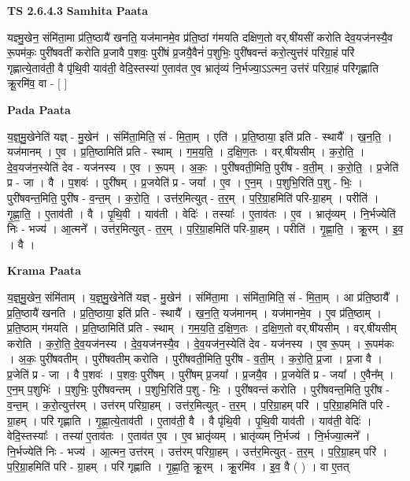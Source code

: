\documentclass[17pt]{extarticle}
\begin{document}
\textbf{TS 2.6.4.3 } \newline
\textbf{Samhita Paata} \newline

यज्ञ्मु॒खेन॒ संमि॑ता॒मा प्र॑ति॒ष्ठायै॑ खनति॒ यज॑मानमे॒व प्र॑ति॒ष्ठां ग॑मयति दक्षिण॒तो वर्.षी॑यसीं करोति देव॒यज॑नस्यै॒व रू॒पम॑कः॒ पुरी॑षवतीं करोति प्र॒जावै प॒शवः॒ पुरी॑षं प्र॒जयै॒वैनं॑ प॒शुभिः॒ पुरी॑षवन्तं करो॒त्युत्त॑रं परिग्रा॒हं परि॑ गृह्णात्ये॒ताव॑ती॒ वै पृ॑थि॒वी याव॑ती॒ वेदि॒स्तस्या॑ ए॒ताव॑त ए॒व भ्रातृ॑व्यं नि॒र्भज्या॒ऽऽत्मन॒ उत्त॑रं परिग्रा॒हं परि॑गृह्णाति क्रू॒रमि॑व॒ वा - [  ] \newline

\textbf{Pada Paata} \newline

य॒ज्ञ्॒मु॒खेनेति॑ यज्ञ् - मु॒खेन॑ । संमि॑ता॒मिति॒ सं - मि॒ता॒म् । एति॑ । प्र॒ति॒ष्ठाया॒ इति॑ प्रति - स्थायै᳚ । ख॒न॒ति॒ । यज॑मानम् । ए॒व । प्र॒ति॒ष्ठामिति॑ प्रति - स्थाम् । ग॒म॒य॒ति॒ । द॒क्षि॒ण॒तः । वर्.षी॑यसीम् । क॒रो॒ति॒ । दे॒व॒यज॑न॒स्येति॑ देव - यज॑नस्य । ए॒व । रू॒पम् । अ॒कः॒ । पुरी॑षवती॒मिति॒ पुरी॑ष - व॒ती॒म् । क॒रो॒ति॒ । प्र॒जेति॑ प्र - जा । वै । प॒शवः॑ । पुरी॑षम् । प्र॒जयेति॑ प्र - जया᳚ । ए॒व । ए॒न॒म् । प॒शुभि॒रिति॑ प॒शु - भिः॒ । पुरी॑षवन्त॒मिति॒ पुरी॑ष - व॒न्त॒म् । क॒रो॒ति॒ । उत्त॑र॒मित्युत् - त॒र॒म् । प॒रि॒ग्रा॒हमिति॑ परि-ग्रा॒हम् । परीति॑ । गृ॒ह्णा॒ति॒ । ए॒ताव॑ती । वै । पृ॒थि॒वी । याव॑ती । वेदिः॑ । तस्याः᳚ । ए॒ताव॑तः । ए॒व । भ्रातृ॑व्यम् । नि॒र्भज्येति॑ निः - भज्य॑ । आ॒त्मने᳚ । उत्त॑र॒मित्युत् - त॒र॒म् । प॒रि॒ग्रा॒हमिति॑ परि-ग्रा॒हम् । परीति॑ । गृ॒ह्णा॒ति॒ । क्रू॒रम् । इ॒व॒ । वै ।  \newline


\textbf{Krama Paata} \newline

य॒ज्ञ्॒मु॒खेन॒ संमि॑ताम् । य॒ज्ञ्॒मु॒खेनेति॑ यज्ञ् - मु॒खेन॑ । संमि॑ता॒मा । संमि॑ता॒मिति॒ सं - मि॒ता॒म् । आ प्र॑ति॒ष्ठायै᳚ । प्र॒ति॒ष्ठायै॑ खनति । प्र॒ति॒ष्ठाया॒ इति॑ प्रति - स्थायै᳚ । ख॒न॒ति॒ यज॑मानम् । यज॑मानमे॒व । ए॒व प्र॑ति॒ष्ठाम् । प्र॒ति॒ष्ठाम् ग॑मयति । प्र॒ति॒ष्ठामिति॑ प्रति - स्थाम् । ग॒म॒य॒ति॒ द॒क्षि॒ण॒तः । द॒क्षि॒ण॒तो वर्.षी॑यसीम् । वर्.षी॑यसीम् करोति । क॒रो॒ति॒ दे॒व॒यज॑नस्य । दे॒व॒यज॑नस्यै॒व । दे॒व॒यज॑न॒स्येति॑ देव - यज॑नस्य । ए॒व रू॒पम् । रू॒पम॑कः । अ॒कः॒ पुरी॑षवतीम् । पुरी॑षवतीम् करोति । पुरी॑षवती॒मिति॒ पुरी॑ष - व॒ती॒म् । क॒रो॒ति॒ प्र॒जा । प्र॒जा वै । प्र॒जेति॑ प्र - जा । वै प॒शवः॑ । प॒शवः॒ पुरी॑षम् । पुरी॑षम् प्र॒जया᳚ । प्र॒जयै॒व । प्र॒जयेति॑ प्र - जया᳚ । ए॒वैन᳚म् । ए॒न॒म् प॒शुभिः॑ । प॒शुभिः॒ पुरी॑षवन्तम् । प॒शुभि॒रिति॑ प॒शु - भिः॒ । पुरी॑षवन्तं करोति । पुरी॑षवन्त॒मिति॒ पुरी॑ष - व॒न्त॒म् । क॒रो॒त्युत्त॑रम् । उत्त॑रम् परिग्रा॒हम् । उत्त॑र॒मित्युत् - त॒र॒म् । प॒रि॒ग्रा॒हम् परि॑ । प॒रि॒ग्रा॒हमिति॑ परि - ग्रा॒हम् । परि॑ गृह्णाति । गृ॒ह्णा॒त्ये॒ताव॑ती । ए॒ताव॑ती॒ वै । वै पृ॑थि॒वी । पृ॒थि॒वी याव॑ती । याव॑ती॒ वेदिः॑ । वेदि॒स्तस्याः᳚ । तस्या॑ ए॒ताव॑तः । ए॒ताव॑त ए॒व । ए॒व भ्रातृ॑व्यम् । भ्रातृ॑व्यम् नि॒र्भज्य॑ । नि॒र्भज्या॒त्मने᳚ । नि॒र्भज्येति॑ निः - भज्य॑ । आ॒त्मन॒ उत्त॑रम् । उत्त॑रम् परिग्रा॒हम् । उत्त॑र॒मित्युत् - त॒र॒म् । प॒रि॒ग्रा॒हम् परि॑ । प॒रि॒ग्रा॒हमिति॑ परि - ग्रा॒हम् । परि॑ गृह्णाति । गृ॒ह्णा॒ति॒ क्रू॒रम् । क्रू॒रमि॑व । इ॒व॒ वै ( ) । वा ए॒तत् \newline
\end{document}

